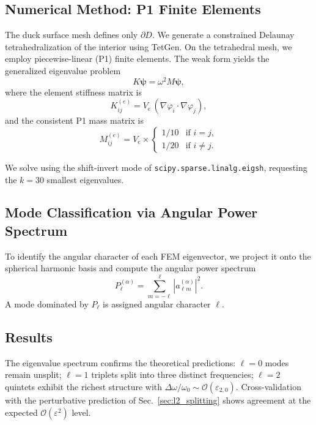 \documentclass[aps,prd,twocolumn,superscriptaddress,nofootinbib]{revtex4-2}
\newcommand{\order}[1]{\mathcal{O}(#1)}
\begin{document}
\subsection{Numerical Method: P1 Finite Elements}
\label{sec:fem_method}

The duck surface mesh defines only $\partial D$.
We generate a constrained Delaunay tetrahedralization of the interior
using TetGen.
On the tetrahedral mesh, we employ piecewise-linear (P1) finite elements.
The weak form yields the generalized eigenvalue problem
\begin{equation}
K \boldsymbol{\psi} = \omega^2 M \boldsymbol{\psi},
\label{eq:gen_eigenvalue}
\end{equation}
where the element stiffness matrix is
\begin{equation}
K^{(e)}_{ij} = V_e \, (\nabla \varphi_i \cdot \nabla \varphi_j),
\end{equation}
and the consistent P1 mass matrix is
\begin{equation}
M^{(e)}_{ij} = V_e \times \begin{cases} 1/10 & \text{if } i = j, \\
1/20 & \text{if } i \neq j. \end{cases}
\end{equation}

We solve using the shift-invert mode of \texttt{scipy.sparse.linalg.eigsh},
requesting the $k = 30$ smallest eigenvalues.


\subsection{Mode Classification via Angular Power Spectrum}
\label{sec:mode_class}

To identify the angular character of each FEM eigenvector, we project it
onto the spherical harmonic basis and compute the angular power spectrum
\begin{equation}
P_\ell^{(\alpha)} = \sum_{m=-\ell}^{\ell}
|a_{\ell m}^{(\alpha)}|^2.
\end{equation}
A mode dominated by $P_\ell$ is assigned angular character $\ell$.


\subsection{Results}
\label{sec:fem_results}

The eigenvalue spectrum confirms the theoretical predictions:
$\ell = 0$ modes remain unsplit; $\ell = 1$ triplets split into three
distinct frequencies; $\ell = 2$ quintets exhibit the richest structure with
$\Delta\omega/\omega_0 \sim \order{\varepsilon_{2,0}}$.
Cross-validation with the perturbative prediction of
Sec.~\ref{sec:l2_splitting} shows agreement at the expected
$\order{\varepsilon^2}$ level.
\end{document}
